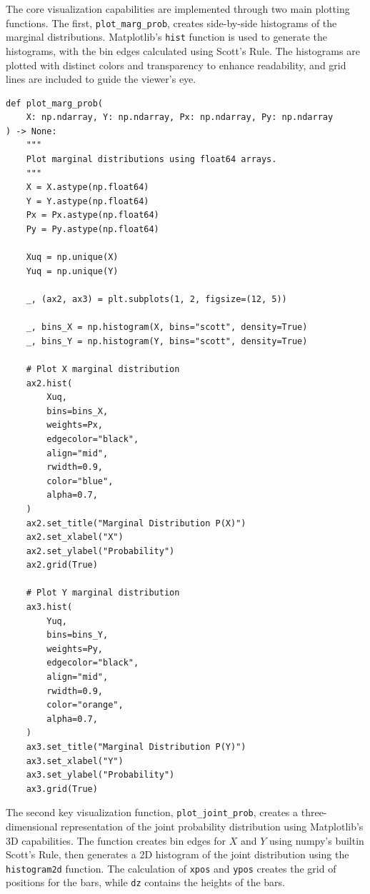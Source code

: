 \documentclass{article}
\begin{document}
The core visualization capabilities are implemented through two main plotting functions. The first, \texttt{plot\_marg\_prob}, creates side-by-side histograms of the marginal distributions. Matplotlib's \texttt{hist} function is used to generate the histograms, with the bin edges calculated using Scott's Rule. The histograms are plotted with distinct colors and transparency to enhance readability, and grid lines are included to guide the viewer's eye.

\begin{verbatim}
def plot_marg_prob(
    X: np.ndarray, Y: np.ndarray, Px: np.ndarray, Py: np.ndarray
) -> None:
    """
    Plot marginal distributions using float64 arrays.
    """
    X = X.astype(np.float64)
    Y = Y.astype(np.float64)
    Px = Px.astype(np.float64)
    Py = Py.astype(np.float64)

    Xuq = np.unique(X)
    Yuq = np.unique(Y)

    _, (ax2, ax3) = plt.subplots(1, 2, figsize=(12, 5))

    _, bins_X = np.histogram(X, bins="scott", density=True)
    _, bins_Y = np.histogram(Y, bins="scott", density=True)

    # Plot X marginal distribution
    ax2.hist(
        Xuq,
        bins=bins_X,
        weights=Px,
        edgecolor="black",
        align="mid",
        rwidth=0.9,
        color="blue",
        alpha=0.7,
    )
    ax2.set_title("Marginal Distribution P(X)")
    ax2.set_xlabel("X")
    ax2.set_ylabel("Probability")
    ax2.grid(True)

    # Plot Y marginal distribution
    ax3.hist(
        Yuq,
        bins=bins_Y,
        weights=Py,
        edgecolor="black",
        align="mid",
        rwidth=0.9,
        color="orange",
        alpha=0.7,
    )
    ax3.set_title("Marginal Distribution P(Y)")
    ax3.set_xlabel("Y")
    ax3.set_ylabel("Probability")
    ax3.grid(True)
\end{verbatim}

The second key visualization function, \texttt{plot\_joint\_prob}, creates a three-dimensional representation of the joint probability distribution using Matplotlib's 3D capabilities. The function creates bin edges for \( X \) and \( Y \) using numpy's builtin Scott's Rule, then generates a 2D histogram of the joint distribution using the \texttt{histogram2d} function. The calculation of \texttt{xpos} and \texttt{ypos} creates the grid of positions for the bars, while \texttt{dz} contains the heights of the bars. 
\end{document}
